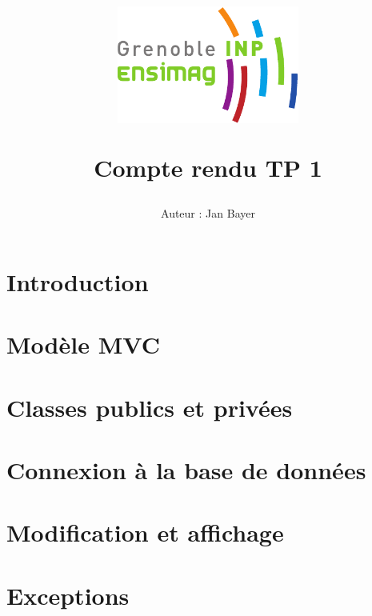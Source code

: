 \documentclass[10pt]{article}
\title{\begin{center}
\includegraphics[width=6cm]{ENSIMAG-eps-converted-to.pdf}
\end{center} \vspace{1cm} Compte rendu TP 1}
\author{Auteur : Jan Bayer }
\begin{document}
\maketitle

\section{Introduction}\label{sec:introduction}
\section{Modèle MVC}\label{sec:modele-mvc}
\section{Classes publics et privées}\label{sec:classes-publics-et-privees}
\section{Connexion à la base de données}\label{sec:connexion-a-la-base-de-donnees}
\section{Modification et affichage}\label{sec:modification-et-affichage}


\section{Exceptions}\label{sec:exceptions}
\end{document}
